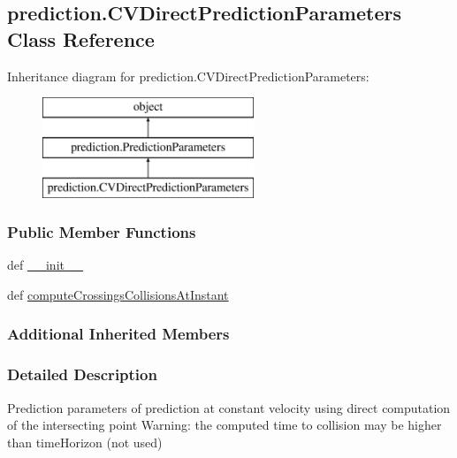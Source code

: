 \hypertarget{classprediction_1_1CVDirectPredictionParameters}{\subsection{prediction.\-C\-V\-Direct\-Prediction\-Parameters Class Reference}
\label{classprediction_1_1CVDirectPredictionParameters}
}
Inheritance diagram for prediction.\-C\-V\-Direct\-Prediction\-Parameters\-:\begin{figure}[H]
\begin{center}
\leavevmode
\includegraphics[height=3.000000cm]{classprediction_1_1CVDirectPredictionParameters}
\end{center}
\end{figure}
\subsubsection*{Public Member Functions}
\begin{DoxyCompactItemize}
\item 
def \hyperlink{classprediction_1_1CVDirectPredictionParameters_a0199b4a5f2c19e30285bc54033c015b3}{\-\_\-\-\_\-init\-\_\-\-\_\-}
\item 
def \hyperlink{classprediction_1_1CVDirectPredictionParameters_aacee8062dce9911dac3e148766a24dde}{compute\-Crossings\-Collisions\-At\-Instant}
\end{DoxyCompactItemize}
\subsubsection*{Additional Inherited Members}


\subsubsection{Detailed Description}
\begin{DoxyVerb}Prediction parameters of prediction at constant velocity
using direct computation of the intersecting point
Warning: the computed time to collision may be higher than timeHorizon (not used)\end{DoxyVerb}
 

